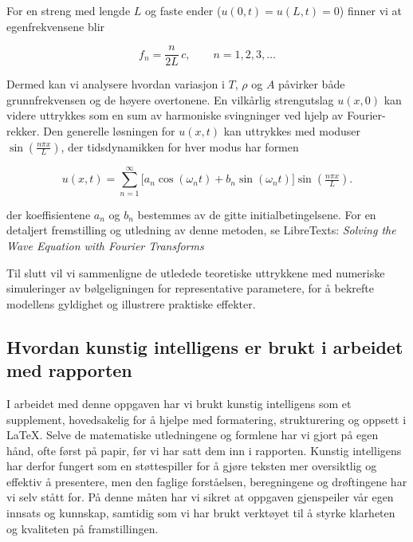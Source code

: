 For en streng med lengde $L$ og faste ender ($u(0,t)=u(L,t)=0$) finner vi at egenfrekvensene blir

\begin{equation*}
  f_n = \frac{n}{2L}\,c, \qquad n=1,2,3,\dots
\end{equation*}

Dermed kan vi analysere hvordan variasjon i $T$, $\rho$ og $A$ påvirker både grunnfrekvensen og de høyere overtonene.
En vilkårlig strengutslag $u(x,0)$ kan videre uttrykkes som en sum av harmoniske svingninger ved hjelp av Fourier-rekker.
Den generelle løsningen for $u(x,t)$ kan uttrykkes med moduser 
$\sin\!\left(\tfrac{n\pi x}{L}\right)$, der tidsdynamikken for hver modus har formen 

\begin{equation*}
    u(x,t) = \sum_{n=1}^{\infty} \bigl[a_n \cos(\omega_n t) + b_n \sin(\omega_n t)\bigr] 
    \sin\!\left(\tfrac{n\pi x}{L}\right).
\end{equation*}

der koeffisientene $a_n$ og $b_n$ bestemmes av de gitte initialbetingelsene.
For en detaljert fremstilling og utledning av denne metoden, se LibreTexts: 
\textit{Solving the Wave Equation with Fourier Transforms} \parencite{libretextsWave}



Til slutt vil vi sammenligne de utledede teoretiske uttrykkene med numeriske simuleringer 
av bølgeligningen for representative parametere, for å bekrefte modellens gyldighet og illustrere praktiske effekter.

\subsection{Hvordan kunstig intelligens er brukt i arbeidet med rapporten}
I arbeidet med denne oppgaven har vi brukt kunstig intelligens som et supplement, hovedsakelig for å hjelpe med formatering, strukturering og oppsett i LaTeX. 
Selve de matematiske utledningene og formlene har vi gjort på egen hånd, ofte først på papir, før vi har satt dem inn i rapporten. 
Kunstig intelligens har derfor fungert som en støttespiller for å gjøre teksten mer oversiktlig og effektiv å presentere, men den faglige forståelsen, beregningene og drøftingene har vi selv stått for. 
På denne måten har vi sikret at oppgaven gjenspeiler vår egen innsats og kunnskap, samtidig som vi har brukt verktøyet til å styrke klarheten og kvaliteten på framstillingen.